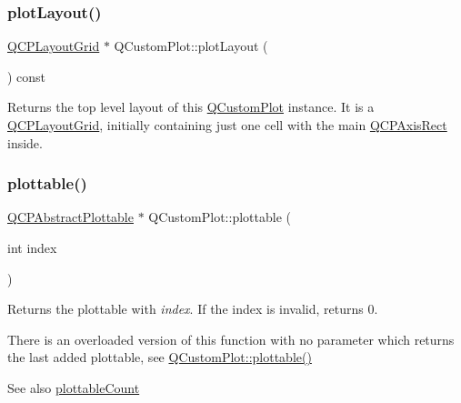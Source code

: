 \subsubsection{\texorpdfstring{plot\+Layout()}{plotLayout()}}
{\footnotesize\ttfamily \mbox{\hyperlink{class_q_c_p_layout_grid}{Q\+C\+P\+Layout\+Grid}} $\ast$ Q\+Custom\+Plot\+::plot\+Layout (\begin{DoxyParamCaption}{ }\end{DoxyParamCaption}) const\hspace{0.3cm}{\ttfamily [inline]}}

Returns the top level layout of this \mbox{\hyperlink{class_q_custom_plot}{Q\+Custom\+Plot}} instance. It is a \mbox{\hyperlink{class_q_c_p_layout_grid}{Q\+C\+P\+Layout\+Grid}}, initially containing just one cell with the main \mbox{\hyperlink{class_q_c_p_axis_rect}{Q\+C\+P\+Axis\+Rect}} inside. \mbox{\label{class_q_custom_plot_a32de81ff53e263e785b83b52ecd99d6f}} 
\subsubsection{\texorpdfstring{plottable()}{plottable()}\hspace{0.1cm}{\footnotesize\ttfamily [1/2]}}
{\footnotesize\ttfamily \mbox{\hyperlink{class_q_c_p_abstract_plottable}{Q\+C\+P\+Abstract\+Plottable}} $\ast$ Q\+Custom\+Plot\+::plottable (\begin{DoxyParamCaption}\item[{int}]{index }\end{DoxyParamCaption})}

Returns the plottable with {\itshape index}. If the index is invalid, returns 0.

There is an overloaded version of this function with no parameter which returns the last added plottable, see \mbox{\hyperlink{class_q_custom_plot_adea38bdc660da9412ba69fb939031567}{Q\+Custom\+Plot\+::plottable()}}

\begin{DoxySeeAlso}{See also}
\mbox{\hyperlink{class_q_custom_plot_a5f4f15991c14bf9ad659bb2a19dfbed4}{plottable\+Count}} 
\end{DoxySeeAlso}
\mbox{\label{class_q_custom_plot_adea38bdc660da9412ba69fb939031567}} 
